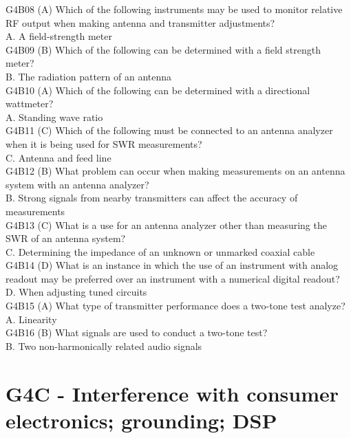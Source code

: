 \documentclass[12pt,letterpaper]{report}
\begin{document}
G4B08 (A) Which of the following instruments may be used to monitor relative RF output when making antenna and transmitter adjustments?\\
A. A field-strength meter\\

G4B09 (B) Which of the following can be determined with a field strength meter?\\
B. The radiation pattern of an antenna\\

G4B10 (A) Which of the following can be determined with a directional wattmeter?\\
A. Standing wave ratio\\

G4B11 (C) Which of the following must be connected to an antenna analyzer when it is being used for SWR measurements?\\
C. Antenna and feed line \\

G4B12 (B) What problem can occur when making measurements on an antenna system with an antenna analyzer? \\
B. Strong signals from nearby transmitters can affect the accuracy of measurements \\

G4B13 (C) What is a use for an antenna analyzer other than measuring the SWR of an antenna system? \\
C. Determining the impedance of an unknown or unmarked coaxial cable\\

G4B14 (D) What is an instance in which the use of an instrument with analog readout may be preferred over an instrument with a numerical digital readout?\\
D. When adjusting tuned circuits\\

G4B15 (A) What type of transmitter performance does a two-tone test analyze?\\
A. Linearity \\

G4B16 (B) What signals are used to conduct a two-tone test?\\
B. Two non-harmonically related audio signals\\

\section{G4C - Interference with consumer electronics; grounding; DSP}
\end{document}
